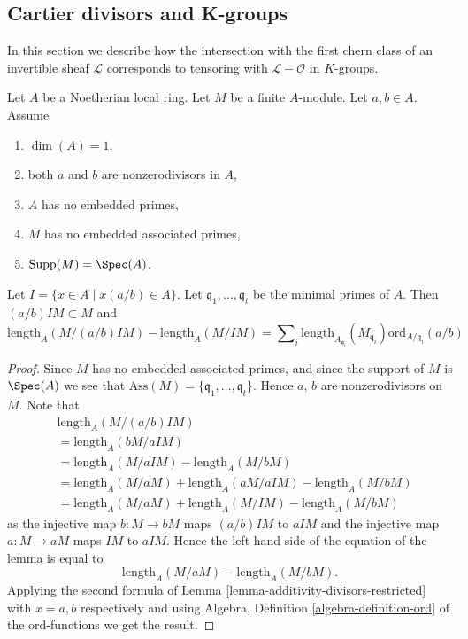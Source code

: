 \subsection{Cartier divisors and K-groups}
\label{subsection-cartier-coherent}

\noindent
In this section we describe how the intersection with the
first chern class of an invertible sheaf $\mathcal{L}$
corresponds to tensoring with $\mathcal{L} - \mathcal{O}$
in $K$-groups.

\begin{lemma}
\label{lemma-no-embedded-points-modules}
Let $A$ be a Noetherian local ring.
Let $M$ be a finite $A$-module.
Let $a, b \in A$.
Assume
\begin{enumerate}
\item $\dim(A) = 1$,
\item both $a$ and $b$ are nonzerodivisors in $A$,
\item $A$ has no embedded primes,
\item $M$ has no embedded associated primes,
\item $\text{Supp}(M) = \Spec(A)$.
\end{enumerate}
Let $I = \{x \in A \mid x(a/b) \in A\}$.
Let $\mathfrak q_1, \ldots, \mathfrak q_t$ be the minimal
primes of $A$. Then $(a/b)IM \subset M$ and
$$
\text{length}_A(M/(a/b)IM)
-
\text{length}_A(M/IM)
=
\sum\nolimits_i
\text{length}_{A_{\mathfrak q_i}}(M_{\mathfrak q_i})
\text{ord}_{A/\mathfrak q_i}(a/b)
$$
\end{lemma}

\begin{proof}
Since $M$ has no embedded associated primes, and since
the support of $M$ is $\Spec(A)$ we see that
$\text{Ass}(M) = \{\mathfrak q_1, \ldots, \mathfrak q_t\}$.
Hence $a$, $b$ are nonzerodivisors on $M$. Note that
\begin{align*}
& \text{length}_A(M/(a/b)IM) \\
& = \text{length}_A(bM/aIM) \\
& = \text{length}_A(M/aIM)
-
\text{length}_A(M/bM) \\
& = \text{length}_A(M/aM) + \text{length}_A(aM/aIM) - \text{length}_A(M/bM) \\
& = \text{length}_A(M/aM) + \text{length}_A(M/IM) - \text{length}_A(M/bM)
\end{align*}
as the injective map $b : M \to bM$ maps $(a/b)IM$ to $aIM$
and the injective map $a : M \to aM$ maps $IM$ to $aIM$.
Hence the left hand side of the equation of the lemma is
equal to
$$
\text{length}_A(M/aM) - \text{length}_A(M/bM).
$$
Applying the second formula of
Lemma \ref{lemma-additivity-divisors-restricted}
with $x = a, b$ respectively
and using Algebra, Definition \ref{algebra-definition-ord}
of the $\text{ord}$-functions we get the result.
\end{proof}

